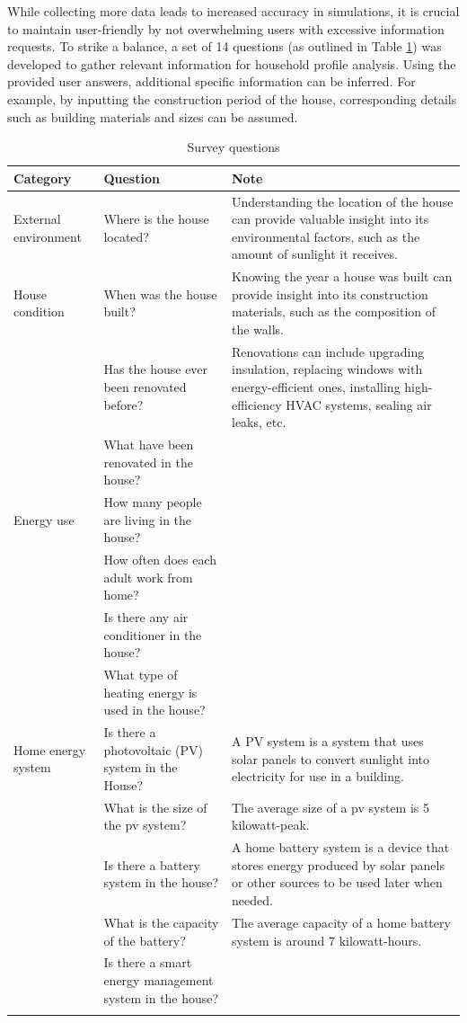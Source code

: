 While collecting more data leads to increased accuracy in simulations, it is crucial to maintain user-friendly by not overwhelming users with excessive information requests. 
To strike a balance, a set of 14 questions (as outlined in Table \ref{tab:questions}) was developed to gather relevant information for household profile analysis. 
Using the provided user answers, additional specific information can be inferred. 
For example, by inputting the construction period of the house, corresponding details such as building materials and sizes can be assumed. 

\begin{center}
    \small
    \begin{longtable}{ | p{} | p{} | p{} | }
        \hline
        Category & Question & Note \\
        \hline
        External environment & Where is the house located? & Understanding the location of the house can provide valuable insight into its environmental factors, such as the amount of sunlight it receives. \\
        \hline
        House condition & When was the house built? & Knowing the year a house was built can provide insight into its construction materials, such as the composition of the walls. \\
          & Has the house ever been renovated before? & Renovations can include upgrading insulation, replacing windows with energy-efficient ones, installing high-efficiency HVAC systems, sealing air leaks, etc. \\
          & What have been renovated in the house? &   \\
        \hline
        Energy use & How many people are living in the house? &   \\
          & How often does each adult work from home? &   \\
          & Is there any air conditioner in the house? &   \\
          & What type of heating energy is used in the house? &   \\
        \hline
        Home energy system  & Is there a photovoltaic (PV) system in the House? & A PV system is a system that uses solar panels to convert sunlight into electricity for use in a building. \\    
          & What is the size of the \gls{pv} system? &  The average size of a \gls{pv} system is 5 kilowatt-peak. \\
          & Is there a battery system in the house? & A home battery system is a device that stores energy produced by solar panels or other sources to be used later when needed. \\
          & What is the capacity of the battery? & The average capacity of a home battery system is around 7 kilowatt-hours. \\
          & Is there a smart energy management system in the house? &   \\
        \hline
    \caption{Survey questions}
    \label{tab:questions}
    \end{longtable}
\end{center}

